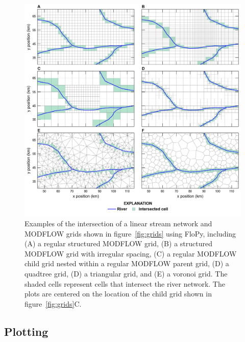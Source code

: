 \documentclass[11pt, oneside]{article}   	%
\begin{document}
\begin{figure}[ht!]
	\begin{center}
		\includegraphics{figures/grids_intersection.png}
	\end{center}
	\caption{Examples of the intersection of a linear stream network and MODFLOW grids shown in figure~\ref{fig:grids} using FloPy, including (A) a regular structured MODFLOW grid, (B) a structured MODFLOW grid with irregular spacing, (C) a regular MODFLOW child grid nested within a regular MODFLOW parent grid, (D) a quadtree grid, (D) a triangular grid, and (E) a voronoi grid. The shaded cells represent cells that intersect the river network. The plots are centered on the location of the child grid shown in figure~\ref{fig:grids}C.}
	\label{fig:intersections}
\end{figure}

\subsection{Plotting}

\lipsum[52-58]
\end{document}
